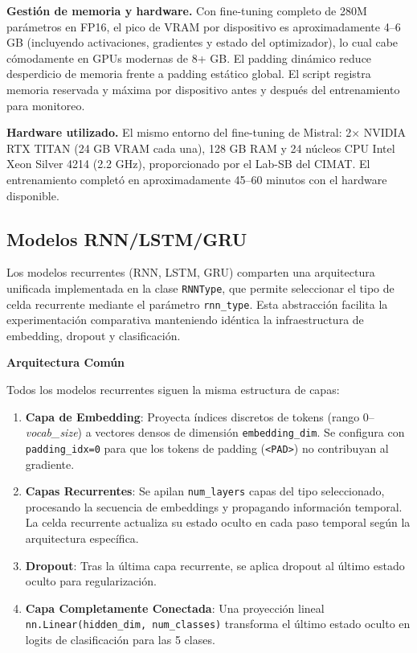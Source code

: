 \documentclass[paper=letter, fontsize=11pt, draft=false]{scrartcl}
\numberwithin{equation}{section} %
\numberwithin{figure}{section} %
\numberwithin{table}{section} %
\numberwithin{subsection}{section}
\begin{document}
\textbf{Gestión de memoria y hardware.} Con fine-tuning completo de 280M parámetros en FP16, el pico de VRAM por dispositivo es aproximadamente 4–6 GB (incluyendo activaciones, gradientes y estado del optimizador), lo cual cabe cómodamente en GPUs modernas de 8+ GB. El padding dinámico reduce desperdicio de memoria frente a padding estático global. El script registra memoria reservada y máxima por dispositivo antes y después del entrenamiento para monitoreo.

\textbf{Hardware utilizado.} El mismo entorno del fine-tuning de Mistral: 2× NVIDIA RTX TITAN (24 GB VRAM cada una), 128 GB RAM y 24 núcleos CPU Intel Xeon Silver 4214 (2.2 GHz), proporcionado por el Lab-SB del CIMAT. El entrenamiento completó en aproximadamente 45–60 minutos con el hardware disponible.


\subsection{Modelos RNN/LSTM/GRU}

Los modelos recurrentes (RNN, LSTM, GRU) comparten una arquitectura unificada implementada en la clase \texttt{RNNType}, que permite seleccionar el tipo de celda recurrente mediante el parámetro \texttt{rnn\_type}. Esta abstracción facilita la experimentación comparativa manteniendo idéntica la infraestructura de embedding, dropout y clasificación.

\textbf{Arquitectura Común}

Todos los modelos recurrentes siguen la misma estructura de capas:
\begin{enumerate}
    \item \textbf{Capa de Embedding}: Proyecta índices discretos de tokens (rango 0–\textit{vocab\_size}) a vectores densos de dimensión \texttt{embedding\_dim}. Se configura con \texttt{padding\_idx=0} para que los tokens de padding (\texttt{<PAD>}) no contribuyan al gradiente.
    
    \item \textbf{Capas Recurrentes}: Se apilan \texttt{num\_layers} capas del tipo seleccionado, procesando la secuencia de embeddings y propagando información temporal. La celda recurrente actualiza su estado oculto en cada paso temporal según la arquitectura específica.
    
    \item \textbf{Dropout}: Tras la última capa recurrente, se aplica dropout al último estado oculto para regularización.
    
    \item \textbf{Capa Completamente Conectada}: Una proyección lineal \texttt{nn.Linear(hidden\_dim, num\_classes)} transforma el último estado oculto en logits de clasificación para las 5 clases.
\end{enumerate}
\end{document}
